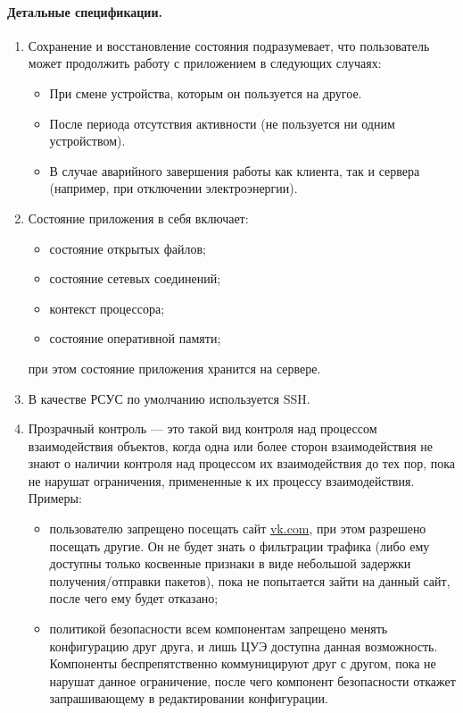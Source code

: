 \paragraph{Детальные спецификации.}
\begin{enumerate}[label={\bfseriesДС-\arabic*.}]
   \item Сохранение и восстановление состояния подразумевает, что пользователь может продолжить работу с приложением в следующих случаях:
         \begin{itemize}[nosep,label=---]
            \item При смене устройства, которым он пользуется на другое.
            \item После периода отсутствия активности (не пользуется ни одним устройством).
            \item В случае аварийного завершения работы как клиента, так и сервера (например, при отключении электроэнергии).
         \end{itemize}
         \label{DS-appstate_switch}
   \item Состояние приложения в себя включает:
         \begin{itemize}[nosep,label=---]
            \item состояние открытых файлов;
            \item состояние сетевых соединений;
            \item контекст процессора;
            \item состояние оперативной памяти;
         \end{itemize}
         при этом состояние приложения хранится на сервере.
         \label{DS-appstate-description}
   \item В качестве РСУС по умолчанию используется SSH. \label{DS-remote_access_default}
   \item Прозрачный контроль --- это такой вид контроля над процессом взаимодействия объектов, когда одна или более сторон взаимодействия не знают о наличии контроля над процессом их взаимодействия до тех пор, пока не нарушат ограничения, примененные к их процессу взаимодействия. Примеры: \label{DS-transparent-control}
         \begin{itemize}[nosep,label=---]
            \item пользователю запрещено посещать сайт \url{vk.com}, при этом разрешено посещать другие. Он не будет знать о фильтрации трафика (либо ему доступны только косвенные признаки в виде небольшой задержки получения/отправки пакетов), пока не попытается зайти на данный сайт, после чего ему будет отказано;
            \item политикой безопасности всем компонентам запрещено менять конфигурацию друг друга, и лишь ЦУЭ доступна данная возможность. Компоненты беспрепятственно коммуницируют друг с другом, пока не нарушат данное ограничение, после чего компонент безопасности откажет запрашивающему в редактировании конфигурации.
         \end{itemize}
\end{enumerate}
